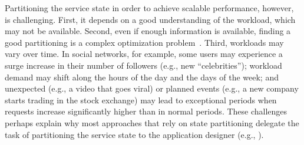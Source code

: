 
Partitioning the service state in order to achieve scalable performance, however, is challenging.
First, it depends on a good understanding of the workload, which may not be available.
Second, even if enough information is available, finding a good partitioning is a complex optimization problem~\cite{curino2010sch,taft2014est}. 
Third, workloads may vary over time. 
In social networks, for example, some users may experience a surge increase in their number of followers (e.g., new ``celebrities''); workload demand may shift along the hours of the day and the days of the week; and unexpected (e.g., a video that goes viral) or planned events (e.g., a new company starts trading in the stock exchange) may lead to exceptional periods when requests increase significantly higher than in normal periods.
These challenges perhaps explain why most approaches that rely on state partitioning delegate the task of partitioning the service state to the application designer (e.g., \cite{Aguilera:2007, bezerra2014ssmr,corbett2013spanner,bli16edcc}).

